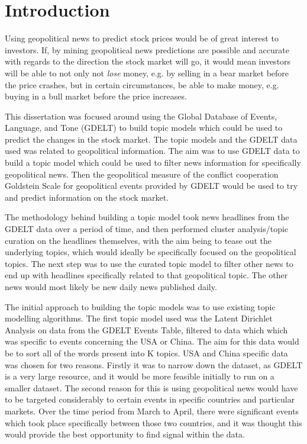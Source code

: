 \section{Introduction}
Using geopolitical news to predict stock prices would be of great interest to investors. If, by mining geopolitical news predictions are possible and accurate with regards to the direction the stock market will go, it would mean investors will be able to not only not \textit{lose} money, e.g. by selling in a bear market before the price crashes, but in certain circumstances, be able to make money, e.g. buying in a bull market before the price increases.

This dissertation was focused around using the Global Database of Events, Language, and Tone (GDELT) to build topic models which could be used to predict the changes in the stock market. The topic models and the GDELT data used was related to geopolitical information. The aim was to use GDELT data to build a topic model which could be used to filter news information for specifically geopolitical news. Then the geopolitical measure of the conflict cooperation Goldstein Scale for geopolitical events provided by GDELT would be used to try and predict information on the stock market.

The methodology behind building a topic model took news headlines from the GDELT data over a period of time, and then performed cluster analysis/topic curation on the headlines themselves, with the aim being to tease out the underlying topics, which would ideally be specifically focused on the geopolitical topics. The next step was to use the curated topic model to filter other news to end up with headlines specifically related to that geopolitical topic. The other news would most likely be new daily news published daily. 

The initial approach to building the topic models was to use existing topic modelling algorithms. The first topic model used was the Latent Dirichlet Analysis on data from the GDELT Events Table, filtered to data which which was specific to events concerning the USA or China. The aim for this data would be to sort all of the words present into K topics. USA and China specific data was chosen for two reasons. Firstly it was to narrow down the dataset, as GDELT is a very large resource, and it would be more feasible initially to run on a smaller dataset. The second reason for this is using geopolitical news would have to be targeted considerably to certain events in specific countries and particular markets. Over the time period from March to April, there were significant events which took place specifically between those two countries, and it was thought this would provide the best opportunity to find signal within the data. 

